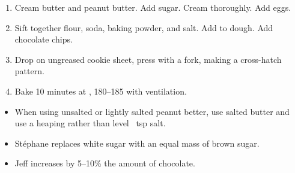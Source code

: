 
\begin{ingredients}
\end{ingredients}


\begin{recipe}
  \begin{enumerate}
  \item Cream butter and peanut butter.  Add sugar.  Cream thoroughly.
    Add eggs.

  \item Sift together flour, soda, baking powder, and salt.  Add to
    dough.  Add chocolate chips.

  \item Drop on ungreased cookie sheet, press with a fork, making a
    cross-hatch pattern.

  \item Bake 10 minutes at , 180--185\degreeC{} with ventilation.

  \end{enumerate}
\end{recipe}

\notes

\begin{itemize}
\item When using unsalted or lightly salted peanut better, use salted butter and use a heaping rather than level \fracQ~tsp salt.
\item Stéphane replaces white sugar with an equal mass of brown sugar.
\item Jeff increases by 5--10\% the amount of chocolate.
\end{itemize}


